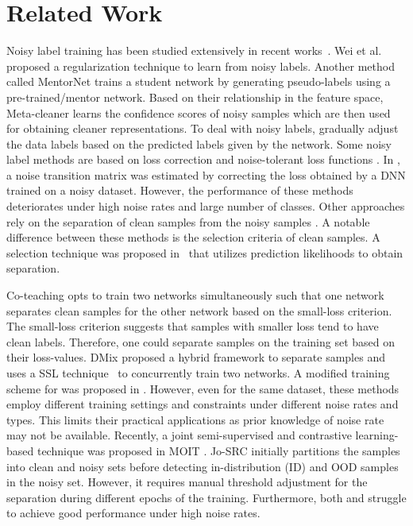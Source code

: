 \documentclass[10pt,twocolumn,letterpaper]{article}
\begin{document}
\section{Related Work} \label{sec:related work}
Noisy label training has been studied extensively in recent works~\cite{liu2021noiseresistant, zheng2021meta, nishi2021augmentation,wang2018iterative,li2019learning}. Wei et al.~\cite{wei2020combating} proposed a regularization technique to learn from noisy labels. Another method called MentorNet \cite{jiang2018mentornet} trains a student network by generating pseudo-labels using a pre-trained/mentor network. 
Based on their relationship in the feature space, Meta-cleaner \cite{zhang2019metacleaner} learns the confidence scores of noisy samples which are then used for obtaining cleaner representations. To deal with noisy labels, \cite{ma2018dimensionality, tanaka2018joint, yi2019probabilistic} gradually adjust the data labels based on the predicted labels given by the network. 
Some noisy label methods are based on loss correction \cite{goldberger2016training,hendrycks2018using, patrini2017making} and noise-tolerant loss functions \cite{chang2018active, zhang2018generalized}. In \cite{hendrycks2018using}, a noise transition matrix was estimated by correcting the loss obtained by a DNN trained on a noisy dataset. However, the performance of these methods deteriorates under high noise rates and large number of classes.
Other approaches rely on the separation of clean samples from the noisy samples \cite{ding2018semi, northcutt2017learning, han2018co, li2020dividemix, yu2019does, tanaka2018joint}. A notable difference between these methods is the selection criteria of clean samples. A selection technique was proposed in~\cite{ding2018semi} that utilizes prediction likelihoods to obtain separation. 

Co-teaching \cite{han2018co} opts to train two networks simultaneously such that one network separates clean samples for the other network based on the small-loss criterion. The small-loss criterion suggests that samples with smaller loss tend to have clean labels. Therefore, one could separate samples on the training set based on their loss-values. 
DMix \cite{li2020dividemix} proposed a hybrid framework to separate samples and uses a SSL technique~\cite{zhang2018mixup} to concurrently train two networks. A modified training scheme for \cite{li2020dividemix} was proposed in \cite{nishi2021augmentation}. However, even for the same dataset, these methods employ different training settings and constraints under different noise rates and types. This limits their practical applications as prior knowledge of noise rate may not be available. Recently, a joint semi-supervised and contrastive learning-based technique was proposed in MOIT \cite{ortego2021multiobjective}. Jo-SRC \cite{yao2021jo} initially partitions the samples into clean and noisy sets before detecting in-distribution (ID) and OOD samples in the noisy set. 
However, it requires manual threshold adjustment for the separation during different epochs of the training. Furthermore, both \cite{yao2021jo} and \cite{ortego2021multiobjective} struggle to achieve good performance under high noise rates.
\end{document}
